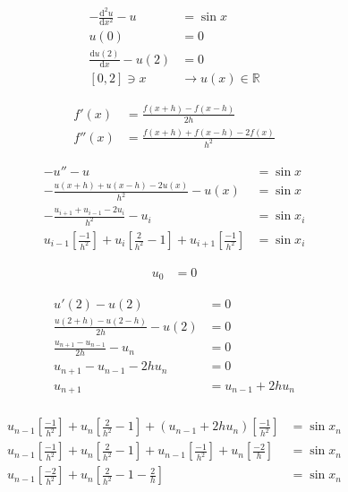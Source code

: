 \documentclass[12pt,a4paper]{mwart}
\begin{document}
\begin{align*}
    -\frac{\mathrm{d}^2u}{\mathrm{d}x^2} - u &= \sin x \\
    u(0) &= 0 \\
    \frac{\mathrm{d}u(2)}{\mathrm{d}x} - u(2) &= 0 \\
    [0,2] \ni x &\to u(x) \in \mathbb{R}
\end{align*}

\begin{align*}
    f'(x) &= \frac{f(x+h)-f(x-h)}{2h} \\
    f''(x) &= \frac{f(x+h) + f(x-h) - 2f(x)}{h^2}
\end{align*}

\begin{align*}
    -u'' - u &= \sin x \\
    -\frac{u(x+h) + u(x-h) - 2u(x)}{h^2} - u(x) &= \sin x \\
    -\frac{u_{i+1} + u_{i-1} - 2u_i}{h^2} - u_i &= \sin x_i \\
    u_{i-1}\left[\frac{-1}{h^2}\right] + u_i\left[\frac{2}{h^2}-1\right] + u_{i+1}\left[\frac{-1}{h^2}\right] &= \sin x_i
\end{align*}

\begin{align*}
    u_0 &= 0
\end{align*}

\begin{align*}
    u'(2) - u(2) &= 0 \\
    \frac{u(2+h)-u(2-h)}{2h} - u(2) &= 0 \\
    \frac{u_{n+1}-u_{n-1}}{2h} - u_n &= 0 \\
    u_{n+1} - u_{n-1} - 2h u_n &= 0 \\
    u_{n+1} &= u_{n-1} + 2h u_n \\
\end{align*}

\begin{align*}
    u_{n-1}\left[\frac{-1}{h^2}\right] + u_n\left[\frac{2}{h^2}-1\right] + (u_{n-1} + 2h u_n)\left[\frac{-1}{h^2}\right] &= \sin x_n \\
    u_{n-1}\left[\frac{-1}{h^2}\right] + u_n\left[\frac{2}{h^2}-1\right] + u_{n-1}\left[\frac{-1}{h^2}\right] + u_n\left[\frac{-2}{h}\right] &= \sin x_n \\
    u_{n-1}\left[\frac{-2}{h^2}\right] + u_n\left[\frac{2}{h^2}-1-\frac{2}{h}\right] &= \sin x_n
\end{align*}
\end{document}
